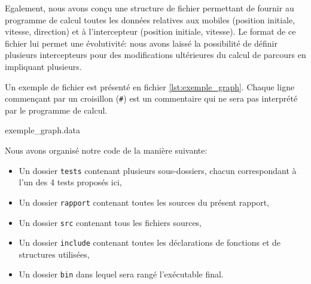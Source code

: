 	Egalement, nous avons conçu une structure de fichier permettant de fournir au programme de calcul toutes les données relatives aux mobiles (position initiale, vitesse, direction) et à l'intercepteur (position initiale, vitesse). Le format de ce fichier lui permet une évolutivité: nous avons laissé la possibilité de définir plusieurs intercepteurs pour des modifications ultérieures du calcul de parcours en impliquant plusieurs.

	Un exemple de fichier est présenté en fichier \ref{lst:exemple_graph}. Chaque ligne commençant par un croisillon (\texttt{\#}) est un commentaire qui ne sera pas interprété par le programme de calcul.

	\begin{listing}[H]
      	\caption{exemple\_graph.data}
      	\label{lst:exemple_graph}
  	\end{listing}

  	Nous avons organisé notre code de la manière suivante:
  	\begin{itemize}
  		\item Un dossier \texttt{tests} contenant plusieurs sous-dossiers, chacun correspondant à l'un des 4 tests proposés ici,
  		\item Un dossier \texttt{rapport} contenant toutes les sources du présent rapport,
  		\item Un dossier \texttt{src} contenant tous les fichiers sources,
        \item Un dossier \texttt{include} contenant toutes les déclarations de fonctions et de structures utilisées,
        \item Un dossier \texttt{bin} dans lequel sera rangé l'exécutable final.
  	\end{itemize}
